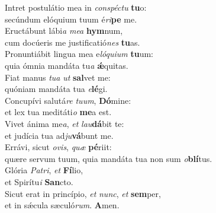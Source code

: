 \evenverse Intret postulátio mea in \textit{con}\textit{spé}\textit{ctu} \textbf{tu}o:~\*\\
\evenverse secúndum elóquium tuum é\textit{ri}\textbf{pe} me.\\
\oddverse Eructábunt lábi\textit{a} \textit{me}\textit{a} \textbf{hym}num,~\*\\
\oddverse cum docúeris me justificatió\textit{nes} \textbf{tu}as.\\
\evenverse Pronuntiábit lingua mea e\textit{ló}\textit{qui}\textit{um} \textbf{tu}um:~\*\\
\evenverse quia ómnia mandáta tu\textit{a} \textbf{ǽ}quitas.\\
\oddverse Fiat manus \textit{tu}\textit{a} \textit{ut} \textbf{sal}vet me:~\*\\
\oddverse quóniam mandáta tua \textit{e}\textbf{lé}gi.\\
\evenverse Concupívi salutá\textit{re} \textit{tu}\textit{um}, \textbf{Dó}mine:~\*\\
\evenverse et lex tua meditáti\textit{o} \textbf{me}a est.\\
\oddverse Vivet ánima me\textit{a}, \textit{et} \textit{lau}\textbf{dá}bit te:~\*\\
\oddverse et judícia tua ad\textit{ju}\textbf{vá}bunt me.\\
\evenverse Errávi, sicut \textit{o}\textit{vis}, \textit{quæ} \textbf{pé}riit:~\*\\
\evenverse quære servum tuum, quia mandáta tua non sum \textit{o}\textbf{blí}tus.\\
\oddverse Glória \textit{Pa}\textit{tri}, \textit{et} \textbf{Fí}lio,~\*\\
\oddverse et Spirítu\textit{i} \textbf{San}cto.\\
\evenverse Sicut erat in princípio, \textit{et} \textit{nunc}, \textit{et} \textbf{sem}per,~\*\\
\evenverse et in sǽcula sæculó\textit{rum}. \textbf{A}men.\\
